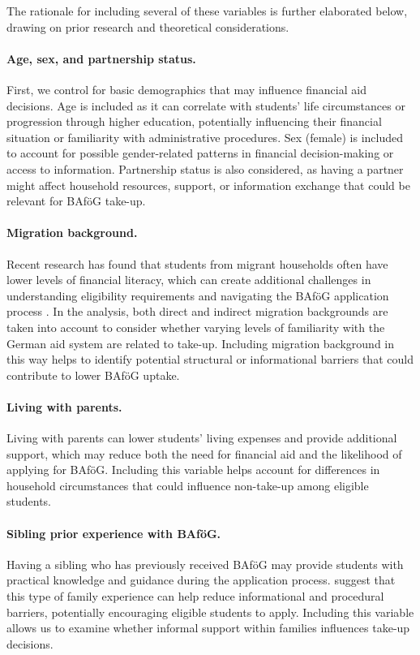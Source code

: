 The rationale for including several of these variables is further elaborated below, drawing on prior research and theoretical considerations. 

\paragraph{Age, sex, and partnership status.}
First, we control for basic demographics that may influence financial aid decisions. Age is included as it can correlate with students’ life circumstances or progression through higher education, potentially influencing their financial situation or familiarity with administrative procedures. Sex (female) is included to account for possible gender-related patterns in financial decision-making or access to information. Partnership status is also considered, as having a partner might affect household resources, support, or information exchange that could be relevant for BAföG take-up.

\paragraph{Migration background.}
Recent research has found that students from migrant households often have lower levels of financial literacy, which can create additional challenges in understanding eligibility requirements and navigating the BAföG application process \citep{Tsegay_2024}. In the analysis, both direct and indirect migration backgrounds are taken into account to consider whether varying levels of familiarity with the German aid system are related to take-up. Including migration background in this way helps to identify potential structural or informational barriers that could contribute to lower BAföG uptake.

\paragraph{Living with parents.}
Living with parents can lower students’ living expenses and provide additional support, which may reduce both the need for financial aid and the likelihood of applying for BAföG. Including this variable helps account for differences in household circumstances that could influence non-take-up among eligible students.

\paragraph{Sibling prior experience with BAföG.}
Having a sibling who has previously received BAföG may provide students with practical knowledge and guidance during the application process. \cite{herber_non-take-up_2019} suggest that this type of family experience can help reduce informational and procedural barriers, potentially encouraging eligible students to apply. Including this variable allows us to examine whether informal support within families influences take-up decisions.

